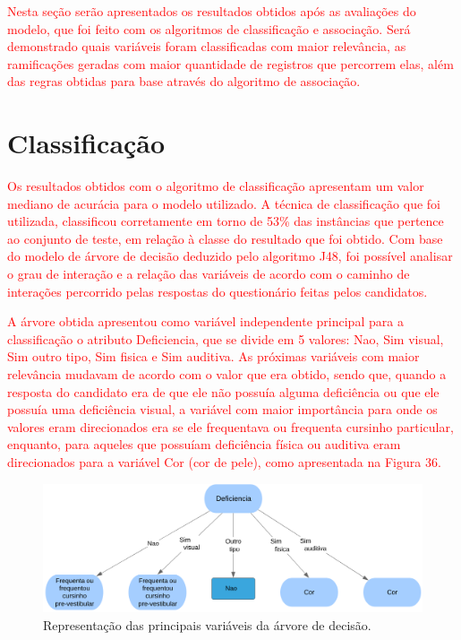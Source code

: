 \label{chapter:Resultados}

\par
\textcolor{red}{Nesta seção serão apresentados os resultados obtidos após as avaliações do modelo, que foi feito com os algoritmos de classificação e associação. Será demonstrado quais variáveis foram classificadas com maior relevância, as ramificações geradas com maior quantidade de registros que percorrem elas, além das regras obtidas para base através do algoritmo de associação.}

\section{Classificação}

\par
\textcolor{red}{Os resultados obtidos com o algoritmo de classificação apresentam um valor mediano de acurácia para o modelo utilizado. A técnica de classificação que foi utilizada, classificou corretamente em torno de 53\% das instâncias que pertence ao conjunto de teste, em relação à classe do resultado que foi obtido. Com base do modelo de árvore de decisão deduzido pelo algoritmo J48, foi possível analisar o grau de interação e a relação das variáveis de acordo com o caminho de interações percorrido pelas respostas do questionário feitas pelos candidatos.}

\par
\textcolor{red}{A árvore obtida apresentou como variável independente principal para a classificação o atributo Deficiencia, que se divide em 5 valores: Nao, Sim visual, Sim outro tipo, Sim fisica e Sim auditiva. As próximas variáveis com maior relevância mudavam de acordo com o valor que era obtido, sendo que, quando a resposta do candidato era de que ele não possuía alguma deficiência ou que ele possuía uma deficiência visual, a variável com maior importância para onde os valores eram direcionados era se ele frequentava ou frequenta cursinho particular, enquanto, para aqueles que possuíam deficiência física ou auditiva eram direcionados para a variável Cor (cor de pele), como apresentada na Figura 36.}

\par
\begin{figure}[!htp]
	\begin{center}
    \caption{\label{fig:waveform_fig} Representação das principais variáveis da árvore de decisão.}
	\includegraphics[scale=0.57]{Figuras/Arvore_gerada_grau2.png}
	\end{center}
\end{figure}


